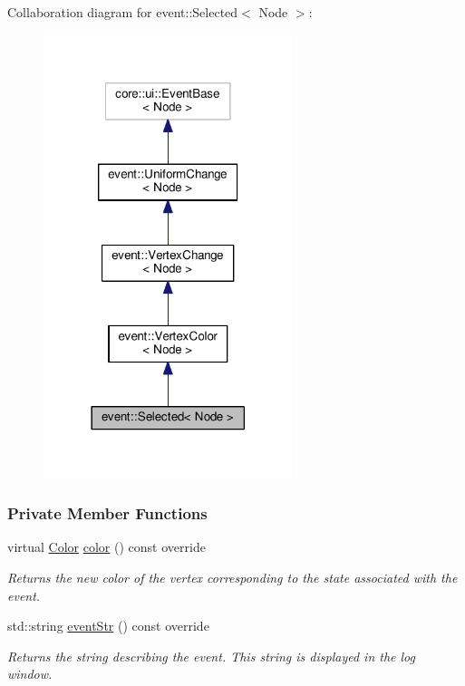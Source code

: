 Collaboration diagram for event\+:\+:Selected$<$ Node $>$\+:\nopagebreak
\begin{figure}[H]
\begin{center}
\leavevmode
\includegraphics[width=206pt]{structevent_1_1Selected__coll__graph}
\end{center}
\end{figure}
\subsubsection*{Private Member Functions}
\begin{DoxyCompactItemize}
\item 
virtual \hyperlink{colors_8h_ab87bacfdad76e61b9412d7124be44c1c}{Color} \hyperlink{structevent_1_1Selected_abe0f36112e9cea58139b7265091d690e}{color} () const override
\begin{DoxyCompactList}\small\item\em Returns the new color of the vertex corresponding to the state associated with the event. \end{DoxyCompactList}\item 
std\+::string \hyperlink{structevent_1_1Selected_a11987cc9ffb8ab6be5695f3d7452c70e}{event\+Str} () const override
\begin{DoxyCompactList}\small\item\em Returns the string describing the event. This string is displayed in the log window. \end{DoxyCompactList}\end{DoxyCompactItemize}
